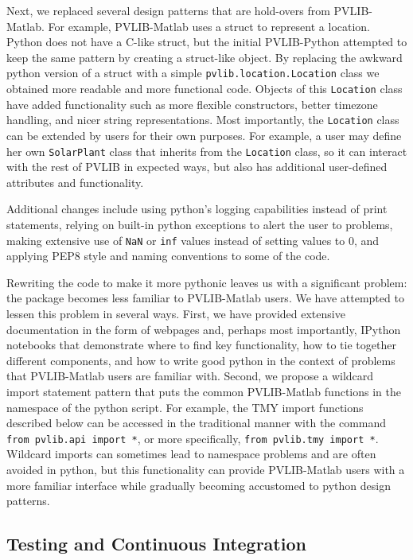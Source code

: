 \documentclass[conference]{IEEEtran}
\begin{document}
Next, we replaced several design patterns that are hold-overs from PVLIB-Matlab. 
For example, PVLIB-Matlab uses a struct to represent a location. 
Python does not have a C-like struct, but the initial PVLIB-Python attempted to keep the same pattern by creating a struct-like object.
By replacing the awkward python version of a struct with a simple \texttt{pvlib.location.Location} class we obtained more readable and more functional code.
Objects of this \texttt{Location} class have added functionality such as more flexible constructors, better timezone handling, and nicer string representations.
Most importantly, the \texttt{Location} class can be extended by users for their own purposes.
For example, a user may define her own \texttt{SolarPlant} class that inherits from the \texttt{Location} class, so it can interact with the rest of PVLIB in expected ways, but also has additional user-defined attributes and functionality.

Additional changes include using python's logging capabilities instead of print statements, relying on built-in python exceptions to alert the user to problems, making extensive use of \texttt{NaN} or \texttt{inf} values instead of setting values to 0, and applying PEP8 style and naming conventions \cite{pep8} to some of the code.

Rewriting the code to make it more pythonic leaves us with a significant problem: the package becomes less familiar to PVLIB-Matlab users. 
We have attempted to lessen this problem in several ways.
First, we have provided extensive documentation in the form of webpages and, perhaps most importantly, IPython notebooks that demonstrate where to find key functionality, how to tie together different components, and how to write good python in the context of problems that PVLIB-Matlab users are familiar with.
Second, we propose a wildcard import statement pattern that puts the common PVLIB-Matlab functions in the namespace of the python script. 
For example, the TMY import functions described below can be accessed in the traditional manner with the command \texttt{from pvlib.api import *}, or more specifically, \texttt{from pvlib.tmy import *}. 
Wildcard imports can sometimes lead to namespace problems and are often avoided in python, but this functionality can provide PVLIB-Matlab users with a more familiar interface while gradually becoming accustomed to python design patterns.


\subsection{Testing and Continuous Integration}
\end{document}
